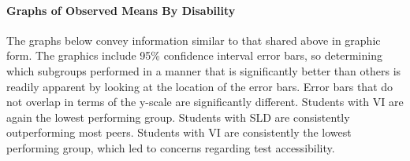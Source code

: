 \documentclass[]{article}
\let\oldparagraph\paragraph
\renewcommand{\paragraph}[1]{\oldparagraph{#1}\mbox{}}
\begin{document}
\hypertarget{graphs-of-observed-means-by-disability}{%
\paragraph{Graphs of Observed Means By
Disability}\label{graphs-of-observed-means-by-disability}}

The graphs below convey information similar to that shared above in
graphic form. The graphics include 95\% confidence interval error bars,
so determining which subgroups performed in a manner that is
significantly better than others is readily apparent by looking at the
location of the error bars. Error bars that do not overlap in terms of
the y-scale are significantly different. Students with VI are again the
lowest performing group. Students with SLD are consistently
outperforming most peers. Students with VI are consistently the lowest
performing group, which led to concerns regarding test accessibility.
\FloatBarrier

\FloatBarrier
\end{document}
